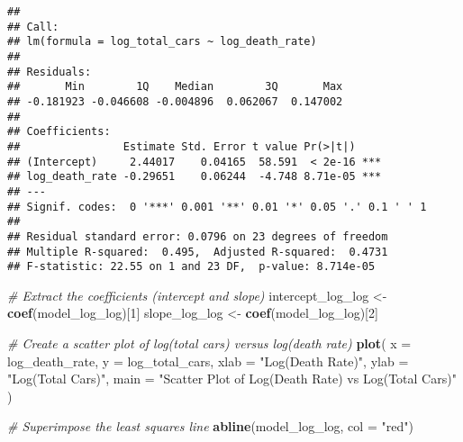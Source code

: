 \documentclass[
]{article}
\newenvironment{Shaded}{\begin{snugshade}}{\end{snugshade}}
\newcommand{\AttributeTok}[1]{\textcolor[rgb]{0.13,0.29,0.53}{#1}}
\newcommand{\CommentTok}[1]{\textcolor[rgb]{0.56,0.35,0.01}{\textit{#1}}}
\newcommand{\DecValTok}[1]{\textcolor[rgb]{0.00,0.00,0.81}{#1}}
\newcommand{\FunctionTok}[1]{\textcolor[rgb]{0.13,0.29,0.53}{\textbf{#1}}}
\newcommand{\NormalTok}[1]{#1}
\newcommand{\OtherTok}[1]{\textcolor[rgb]{0.56,0.35,0.01}{#1}}
\newcommand{\SpecialCharTok}[1]{\textcolor[rgb]{0.81,0.36,0.00}{\textbf{#1}}}
\newcommand{\StringTok}[1]{\textcolor[rgb]{0.31,0.60,0.02}{#1}}
\begin{document}
\begin{Shaded}
\end{Shaded}

\begin{verbatim}
## 
## Call:
## lm(formula = log_total_cars ~ log_death_rate)
## 
## Residuals:
##       Min        1Q    Median        3Q       Max 
## -0.181923 -0.046608 -0.004896  0.062067  0.147002 
## 
## Coefficients:
##                Estimate Std. Error t value Pr(>|t|)    
## (Intercept)     2.44017    0.04165  58.591  < 2e-16 ***
## log_death_rate -0.29651    0.06244  -4.748 8.71e-05 ***
## ---
## Signif. codes:  0 '***' 0.001 '**' 0.01 '*' 0.05 '.' 0.1 ' ' 1
## 
## Residual standard error: 0.0796 on 23 degrees of freedom
## Multiple R-squared:  0.495,  Adjusted R-squared:  0.4731 
## F-statistic: 22.55 on 1 and 23 DF,  p-value: 8.714e-05
\end{verbatim}

\begin{Shaded}
\begin{Highlighting}[]
\CommentTok{\# Extract the coefficients (intercept and slope)}
\NormalTok{intercept\_log\_log }\OtherTok{\textless{}{-}} \FunctionTok{coef}\NormalTok{(model\_log\_log)[}\DecValTok{1}\NormalTok{]}
\NormalTok{slope\_log\_log }\OtherTok{\textless{}{-}} \FunctionTok{coef}\NormalTok{(model\_log\_log)[}\DecValTok{2}\NormalTok{]}

\CommentTok{\# Create a scatter plot of log(total cars) versus log(death rate)}
\FunctionTok{plot}\NormalTok{(}
  \AttributeTok{x =}\NormalTok{ log\_death\_rate,}
  \AttributeTok{y =}\NormalTok{ log\_total\_cars,}
  \AttributeTok{xlab =} \StringTok{"Log(Death Rate)"}\NormalTok{,}
  \AttributeTok{ylab =} \StringTok{"Log(Total Cars)"}\NormalTok{,}
  \AttributeTok{main =} \StringTok{"Scatter Plot of Log(Death Rate) vs Log(Total Cars)"}
\NormalTok{)}

\CommentTok{\# Superimpose the least squares line}
\FunctionTok{abline}\NormalTok{(model\_log\_log, }\AttributeTok{col =} \StringTok{"red"}\NormalTok{)}
\end{Highlighting}
\end{Shaded}
\end{document}
